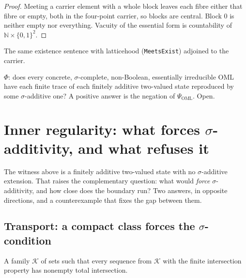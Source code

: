 \begin{proof}
  \leanok
  Meeting a carrier element with a whole block leaves each fibre either that
  fibre or empty, both in the four-point carrier, so blocks are central. Block
  $0$ is neither empty nor everything. Vacuity of the essential form is
  countability of $\mathbb{N} \times \{0,1\}^{2}$.
\end{proof}



\begin{definition}
\label{def:psi-oml}
\leanok
{}
The same existence sentence with latticehood (\texttt{MeetsExist}) adjoined to
the carrier.
\end{definition}

\begin{remark}[$\Phi$]
\label{rmk:phi-open}
$\Phi$: does every concrete, $\sigma$-complete, non-Boolean, essentially
irreducible OML have each finite trace of each finitely additive two-valued
state reproduced by some $\sigma$-additive one? A positive answer is the
negation of $\Psi_{\mathrm{OML}}$. Open.
\end{remark}
\section{Inner regularity: what forces $\sigma$-additivity, and what refuses it}

The witness above is a finitely additive two-valued state with no $\sigma$-additive
extension. That raises the complementary question: what would \emph{force}
$\sigma$-additivity, and how close does the boundary run? Two answers, in
opposite directions, and a counterexample that fixes the gap between them.

\subsection{Transport: a compact class forces the $\sigma$-condition}

\begin{definition}
  \label{def:countably-compact-class}
  \leanok
  A family $\mathcal{K}$ of sets such that every sequence from $\mathcal{K}$
  with the finite intersection property has nonempty total intersection.
\end{definition}

